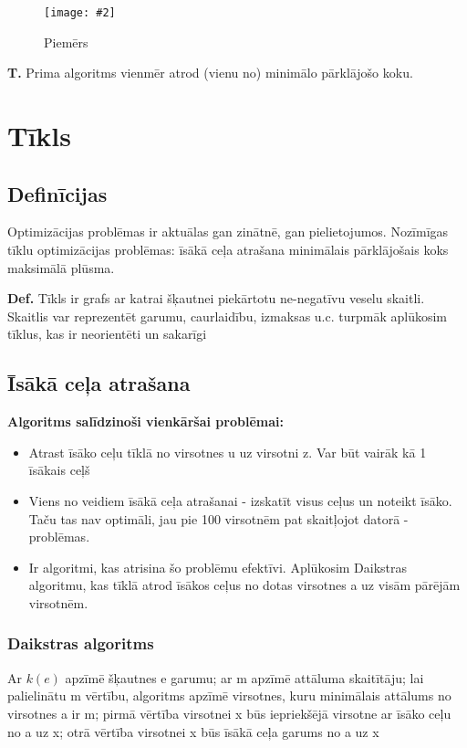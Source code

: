 \documentclass{article}
\newcommand{\illustration}[3]{
	\begin{figure}[H]
		\centering	
		\texttt{[image: \#2]}
		\caption{#3}
	\end{figure}
}
\begin{document}
\illustration{1}{kruskal-1}{Piemērs}

\textbf{T. } Prima algoritms vienmēr atrod (vienu no) minimālo pārklājošo koku.

\section{Tīkls}

\subsection{Definīcijas}
Optimizācijas problēmas ir aktuālas gan zinātnē, gan pielietojumos.  Nozīmīgas tīklu optimizācijas problēmas: īsākā ceļa atrašana minimālais pārklājošais koks maksimālā plūsma.

\textbf{Def.}  Tīkls ir grafs ar katrai šķautnei piekārtotu ne-negatīvu veselu skaitli.  Skaitlis var reprezentēt garumu, caurlaidību, izmaksas u.c.  turpmāk aplūkosim tīklus, kas ir neorientēti un sakarīgi

\subsection{Īsākā ceļa atrašana}

\textbf{Algoritms salīdzinoši vienkāršai problēmai:}
\begin{itemize}
	\item Atrast īsāko ceļu tīklā no virsotnes u uz virsotni z. Var būt vairāk kā 1 īsākais ceļš
	\item Viens no veidiem īsākā ceļa atrašanai - izskatīt visus ceļus un noteikt īsāko. Taču tas nav optimāli, jau pie 100 virsotnēm pat skaitļojot datorā - problēmas.
	\item Ir algoritmi, kas atrisina šo problēmu efektīvi.  Aplūkosim Daikstras algoritmu, kas tīklā atrod īsākos ceļus no dotas virsotnes a uz visām pārējām virsotnēm.
\end{itemize}

\subsubsection{Daikstras algoritms}
Ar $k(e)$ apzīmē šķautnes e garumu; ar m apzīmē attāluma skaitītāju; lai palielinātu m vērtību, algoritms apzīmē virsotnes, kuru minimālais attālums no virsotnes a ir m; pirmā vērtība virsotnei x būs iepriekšējā virsotne ar īsāko ceļu no a uz x; otrā vērtība virsotnei x būs īsākā ceļa garums no a uz x
\end{document}
